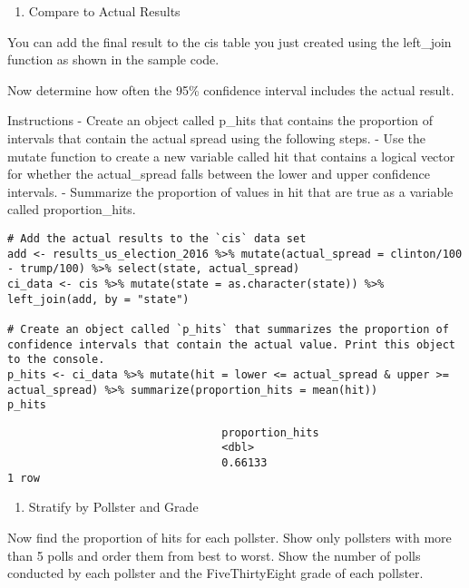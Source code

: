 \documentclass[
]{article}
\providecommand{\tightlist}{%
  \setlength{\itemsep}{0pt}\setlength{\parskip}{0pt}}
\begin{document}
\begin{enumerate}
\def\labelenumi{\arabic{enumi}.}
\setcounter{enumi}{1}
\tightlist
\item
  Compare to Actual Results
\end{enumerate}

You can add the final result to the cis table you just created using the
left\_join function as shown in the sample code.

Now determine how often the 95\% confidence interval includes the actual
result.

Instructions - Create an object called p\_hits that contains the
proportion of intervals that contain the actual spread using the
following steps. - Use the mutate function to create a new variable
called hit that contains a logical vector for whether the actual\_spread
falls between the lower and upper confidence intervals. - Summarize the
proportion of values in hit that are true as a variable called
proportion\_hits.

\begin{verbatim}
# Add the actual results to the `cis` data set
add <- results_us_election_2016 %>% mutate(actual_spread = clinton/100 - trump/100) %>% select(state, actual_spread)
ci_data <- cis %>% mutate(state = as.character(state)) %>% left_join(add, by = "state")

# Create an object called `p_hits` that summarizes the proportion of confidence intervals that contain the actual value. Print this object to the console.
p_hits <- ci_data %>% mutate(hit = lower <= actual_spread & upper >= actual_spread) %>% summarize(proportion_hits = mean(hit))
p_hits
\end{verbatim}

\begin{verbatim}
                                 proportion_hits
                                 <dbl>
                                 0.66133
1 row
\end{verbatim}

\begin{enumerate}
\def\labelenumi{\arabic{enumi}.}
\setcounter{enumi}{2}
\tightlist
\item
  Stratify by Pollster and Grade
\end{enumerate}

Now find the proportion of hits for each pollster. Show only pollsters
with more than 5 polls and order them from best to worst. Show the
number of polls conducted by each pollster and the FiveThirtyEight grade
of each pollster.
\end{document}
